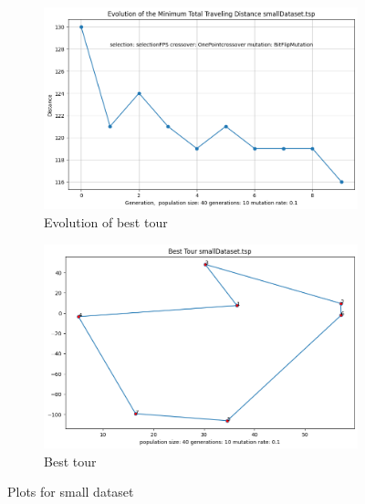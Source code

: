 \documentclass[12pt]{report}
\begin{document}
	\begin{figure}[H]
		\centering
		\begin{subfigure}{.5\textwidth}
			\centering
			\includegraphics[width=.99\linewidth]{../Results/smallDataset/EvolutionPlot.png}
			\caption{Evolution of best tour}
			\label{EvolutionSmallDataset}
		\end{subfigure}%
		\begin{subfigure}{.5\textwidth}
			\centering
			\includegraphics[width=.8\linewidth]{../Results/smallDataset/bestTour.png}
			\caption{Best tour}
			\label{bestTourSmallDataset}
		\end{subfigure}
		\caption{Plots for small dataset}
		\label{PlotsSmallDataset}
	\end{figure}

     
	 


    
\end{document}
